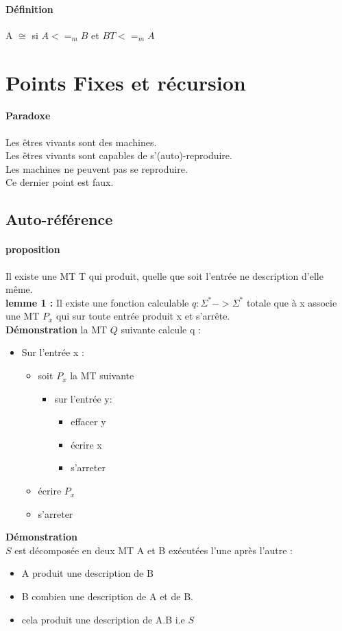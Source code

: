 \documentclass{article}
\begin{document}
{{\paragraph{Définition} A $\cong$ si $A<=_{m}B$ et $BT<=_{m}A$


\section{Points Fixes et récursion}
\paragraph{Paradoxe } Les êtres vivants sont des machines.\\Les êtres vivants sont capables de s'(auto)-reproduire.\\Les machines ne peuvent pas se reproduire.\\Ce dernier point est faux.
\subsection{Auto-référence}
\paragraph{proposition} Il existe une MT T qui produit, quelle que soit l'entrée ne description d'elle même.\\\textbf{lemme 1 : }Il existe une fonction calculable $q:\Sigma^*->\Sigma^*$ totale que à x associe une MT $P_x$ qui sur toute entrée produit x et s’arrête.\\\textbf{Démonstration} la MT $Q$ suivante calcule q :
\begin{itemize}
\item Sur l'entrée x : 
\begin{itemize}
\item soit $P_x$ la MT suivante
\begin{itemize}
\item sur l'entrée y:
\begin{itemize}
\item effacer y
\item écrire x
\item s'arreter
\end{itemize}
\end{itemize}
\item écrire $P_x$
\item s'arreter
\end{itemize}
\end{itemize}
\textbf{Démonstration}\\\indent $S$ est décomposée en deux MT A et B exécutées l'une après l'autre :
\begin{itemize}
\item A produit une description de B
\item B combien une description de A et de B.
\item cela produit une description de A.B i.e $S$
\end{itemize}
}}
\end{document}
